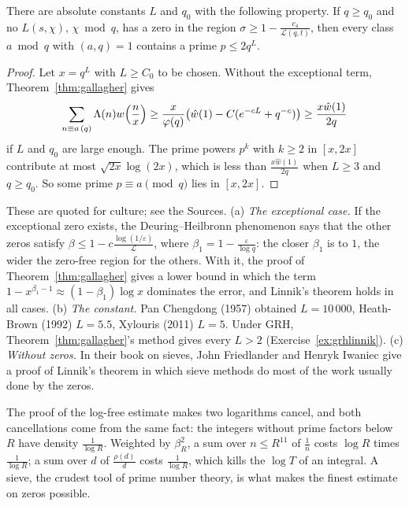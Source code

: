 \begin{corollary}\label{cor:linnik}
There are absolute constants $L$ and $q_0$ with the following property. If $q\ge q_0$ and no $L(s,\chi)$, $\chi\bmod q$, has a zero in the region $\sigma\ge1-\frac{c_4}{\mathcal L(q,t)}$, then every class $a\bmod q$ with $(a,q)=1$ contains a prime $p\le2q^L$.
\end{corollary}
\begin{proof}
Let $x=q^L$ with $L\ge C_0$ to be chosen. Without the exceptional term, Theorem~\ref{thm:gallagher} gives
\[
\sum_{n\equiv a\,(q)}\Lambda(n)w\Bigl(\frac nx\Bigr)\ge\frac x{\varphi(q)}\bigl(\hat w(1)-C(e^{-cL}+q^{-c})\bigr)\ge\frac{x\hat w(1)}{2q}
\]
if $L$ and $q_0$ are large enough. The prime powers $p^k$ with $k\ge2$ in $[x,2x]$ contribute at most $\sqrt{2x}\log(2x)$, which is less than $\frac{x\hat w(1)}{2q}$ when $L\ge3$ and $q\ge q_0$. So some prime $p\equiv a\pmod q$ lies in $[x,2x]$.
\end{proof}

\begin{remark}
These are quoted for culture; see the Sources. (a) \emph{The exceptional case.} If the exceptional zero exists, the Deuring--Heilbronn phenomenon says that the other zeros satisfy $\beta\le1-c\frac{\log(1/\varepsilon)}{\mathcal L}$, where $\beta_1=1-\frac\varepsilon{\log q}$: the closer $\beta_1$ is to $1$, the wider the zero-free region for the others. With it, the proof of Theorem~\ref{thm:gallagher} gives a lower bound in which the term $1-x^{\beta_1-1}\approx(1-\beta_1)\log x$ dominates the error, and Linnik's theorem holds in all cases. (b) \emph{The constant.} Pan Chengdong (1957) obtained $L=10\,000$, Heath-Brown (1992) $L=5.5$, Xylouris (2011) $L=5$. Under GRH, Theorem~\ref{thm:gallagher}'s method gives every $L>2$ (Exercise~\ref{ex:grhlinnik}). (c) \emph{Without zeros.} In their book on sieves, John Friedlander and Henryk Iwaniec give a proof of Linnik's theorem in which sieve methods do most of the work usually done by the zeros.
\end{remark}

\begin{beauty}
The proof of the log-free estimate makes two logarithms cancel, and both cancellations come from the same fact: the integers without prime factors below $R$ have density $\frac1{\log R}$. Weighted by $\beta_R^2$, a sum over $n\le R^{11}$ of $\frac1n$ costs $\log R$ times $\frac1{\log R}$; a sum over $d$ of $\frac{\rho(d)}d$ costs $\frac1{\log R}$, which kills the $\log T$ of an integral. A sieve, the crudest tool of prime number theory, is what makes the finest estimate on zeros possible.
\end{beauty}

